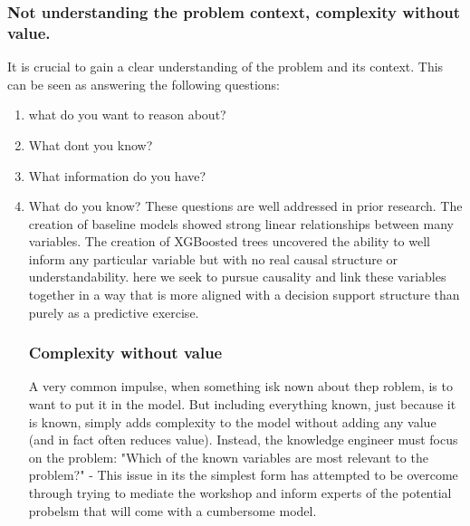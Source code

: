 \subsubsection{Not understanding the problem context, complexity without value.}
It is crucial to gain a clear understanding of the problem and its context. This can be seen as answering the following questions:
\begin{enumerate}
        \item what do you want to reason about?
        \item What dont you know?
        \item What information do you have?
        \item What do you know?
These questions are well addressed in prior research. The creation of baseline models showed strong linear relationships between many variables. The creation of XGBoosted trees uncovered the ability to well inform any particular variable but with no real causal structure or understandability. here we seek to pursue causality and link these variables together in a way that is more aligned with a decision support structure than purely as a predictive exercise.
\subsubsection{Complexity without value}
A very common impulse, when something isk nown about thep roblem, is to want to put it in the model. But including everything known, just because it is known, simply adds complexity to the model without adding any value (and in fact often reduces value). Instead, the knowledge engineer must focus on the problem:
"Which of the known variables are most relevant to the problem?"
- This issue in its the simplest form has attempted to be overcome through trying to mediate the workshop and inform experts of the potential probelsm that will come with a cumbersome model.
\end{enumerate}
